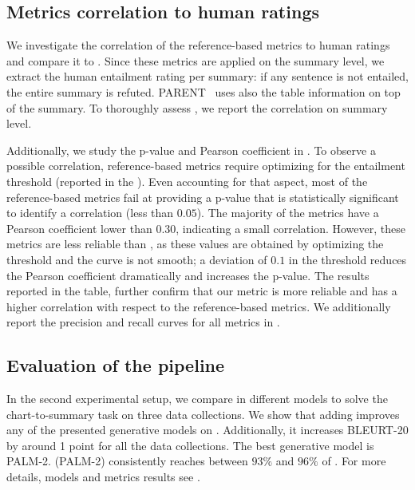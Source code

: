 \subsection{Metrics correlation to human ratings}
We investigate the correlation of the reference-based metrics to human ratings and compare it to \metric{}. 
Since these metrics are applied on the summary level, we extract the human entailment rating per summary: if any sentence is not entailed, the entire summary is refuted. 
PARENT~\citep{dhingra-etal-2019-handling} uses also the table information on top of the summary.
To thoroughly assess \metric{}, we report the correlation on summary level.

Additionally, we study the p-value and Pearson coefficient in . To observe a possible correlation, reference-based metrics require optimizing for the entailment threshold (reported in the ).
Even accounting for that aspect, %
most of the reference-based metrics fail at providing a p-value that is statistically significant to identify a correlation (less than $0.05$). The majority of the metrics have a Pearson coefficient lower than $0.30$, indicating a small correlation. However, these metrics are less reliable than \metric, as these values are obtained by optimizing the threshold and the curve is not smooth; a deviation of $0.1$ in the threshold reduces the Pearson coefficient dramatically and increases the p-value. The results reported in the table, further confirm that our metric is more reliable and has a higher correlation with respect to the reference-based metrics. 
We additionally report the precision and recall curves for all metrics in .








\subsection{Evaluation of the \pipeline{} pipeline}
In the second experimental setup, we compare in  different models to solve the chart-to-summary task on three data collections. 
We show that adding \pipeline{} improves any of the presented generative models on \metric{}. Additionally, it increases BLEURT-20 by around 1 point for all the data collections.
The best generative model is PALM-2. \pipeline(PALM-2) consistently reaches between $93\%$ and $96\%$ of \metric{}.
For more details, models and metrics results see .


